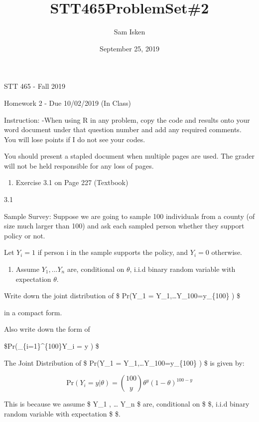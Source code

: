 \documentclass[]{article}
\title{STT465ProblemSet\#2}
\author{Sam Isken}
\date{September 25, 2019}
\providecommand{\tightlist}{%
  \setlength{\itemsep}{0pt}\setlength{\parskip}{0pt}}
\begin{document}
\maketitle

STT 465 - Fall 2019

Homework 2 - Due 10/02/2019 (In Class)

Instruction: -When using R in any problem, copy the code and results
onto your word document under that question number and add any required
comments. You will lose points if I do not see your codes.

You should present a stapled document when multiple pages are used. The
grader will not be held responsible for any loss of pages.

\begin{enumerate}
\def\labelenumi{\arabic{enumi}.}
\tightlist
\item
  Exercise 3.1 on Page 227 (Textbook)
\end{enumerate}

3.1

Sample Survey: Suppose we are going to sample 100 individuals from a
county (of size much larger than 100) and ask each sampled person
whether they support policy or not.

Let \(Y_i=1\) if person i in the sample supports the policy, and
\(Y_i=0\) otherwise.

\begin{enumerate}
\def\labelenumi{\alph{enumi})}
\tightlist
\item
  Assume \(Y_1 , ... Y_n\) are, conditional on \(\theta\), i.i.d binary
  random variable with expectation \(\theta\).
\end{enumerate}

Write down the joint distribution of \$ Pr(Y\_1 =
Y\_1,\ldots{}Y\_100=y\_\{100\}\textbar{} \theta) \$

in a compact form.

Also write down the form of

\$Pr(\Sigma\_\{i=1\}\^{}\{100\}Y\_i = y \textbar{} \theta) \$

The Joint Distribution of \$ Pr(Y\_1 =
Y\_1,\ldots{}Y\_100=y\_\{100\}\textbar{} \theta) \$ is given by:

\[ \text{Pr}(Y_i = y|\theta) = {100 \choose y} \theta^y (1-\theta)^{100-y} \]

This is because we assume \$ Y\_1 , \ldots{} Y\_n \$ are, conditional on
\$ \theta \$, i.i.d binary random variable with expectation \$
\theta \$.
\end{document}
